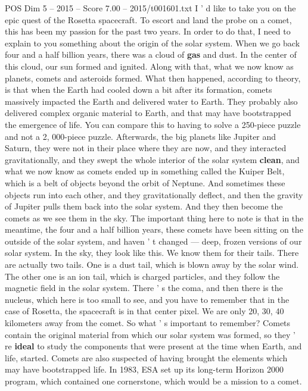 \begin{textsample}{POS Dim 5 – 2015 – Score 7.00 – 2015/t001601.txt}  \label{ex:f5_pos_052}
I ' d like to take you on the epic quest of the Rosetta spacecraft.
To escort and land the probe on a comet, this has been my passion for the past two years.
In order to do that, I need to explain to you something about the origin of the solar system.
When we go back four and a half billion years, there was a cloud of \textbf{gas} and dust.
In the center of this cloud, our sun formed and ignited.
Along with that, what we now know as planets, comets and asteroids formed.
What then happened, according to theory, is that when the Earth had cooled down a bit after its formation, comets massively impacted the Earth and delivered water to Earth.
They probably also delivered complex organic material to Earth, and that may have bootstrapped the emergence of life.
You can compare this to having to solve a 250-piece puzzle and not a 2, 000-piece puzzle.
Afterwards, the big planets like Jupiter and Saturn, they were not in their place where they are now, and they interacted gravitationally, and they swept the whole interior of the solar system \textbf{clean}, and what we now know as comets ended up in something called the Kuiper Belt, which is a belt of objects beyond the orbit of Neptune.
And sometimes these objects run into each other, and they gravitationally deflect, and then the gravity of Jupiter pulls them back into the solar system.
And they then become the comets as we see them in the sky.
The important thing here to note is that in the meantime, the four and a half billion years, these comets have been sitting on the outside of the solar system, and haven ' t changed — deep, frozen versions of our solar system.
In the sky, they look like this.
We know them for their tails.
There are actually two tails.
One is a dust tail, which is blown away by the solar wind.
The other one is an ion tail, which is charged particles, and they follow the magnetic field in the solar system.
There ' s the coma, and then there is the nucleus, which here is too small to see, and you have to remember that in the case of Rosetta, the spacecraft is in that center pixel.
We are only 20, 30, 40 kilometers away from the comet.
So what ' s important to remember?
Comets contain the original material from which our solar system was formed, so they ' re \textbf{ideal} to study the components that were present at the time when Earth, and life, started.
Comets are also suspected of having brought the elements which may have bootstrapped life.
In 1983, ESA set up its long-term Horizon 2000 program, which contained one cornerstone, which would be a mission to a comet.

\end{textsample}

